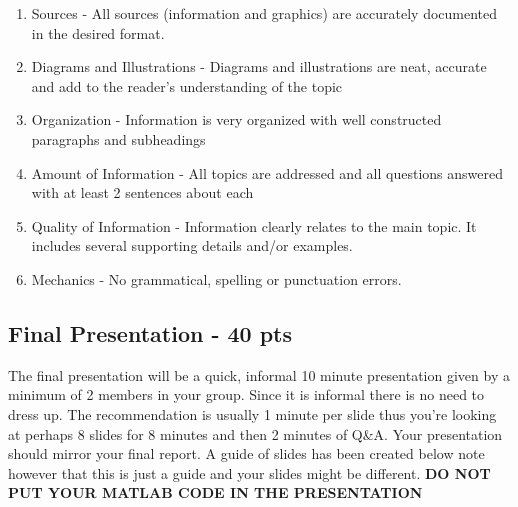 \begin{enumerate}[A]
  \setlength\itemsep{-2pt}

  \item Sources - All sources (information and graphics) are
    accurately documented in the desired format.

  \item Diagrams and Illustrations - Diagrams and illustrations are
    neat, accurate and add to the reader's understanding of the topic

  \item Organization - Information is very organized with well
    constructed paragraphs and subheadings

  \item Amount of Information - All topics are addressed and all
    questions answered with at least 2 sentences about each

  \item Quality of Information - Information clearly relates to the
    main topic. It includes several supporting details and/or
    examples.

  \item Mechanics - No grammatical, spelling or punctuation errors.

\end{enumerate}

\subsection{Final Presentation - 40 pts}

The final presentation will be a quick, informal 10 minute presentation
given by a minimum of 2 members in your group. Since it is informal
there is no need to dress up. The recommendation is usually 1
minute per slide thus you're looking at perhaps 8 slides for 8 minutes
and then 2 minutes of Q\&A. Your presentation should mirror your final
report. A guide of slides has been created below note however that
this is just a guide and your slides might be different. {\bf DO NOT
  PUT YOUR MATLAB CODE IN THE PRESENTATION}

